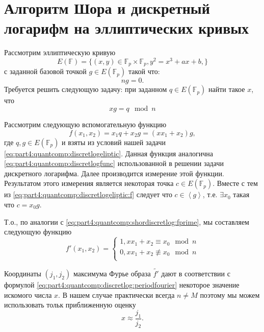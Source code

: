 \section{Алгоритм Шора и дискретный логарифм на эллиптических кривых} 
Рассмотрим эллиптическую кривую 
\[
E\left(\mathbb{F}\right) = \{
(x,y) \in \mathbb{F}_p \times \mathbb{F}_p, y^2 = x^3 +a x + b,
\}
\]
с заданной базовой точкой $g \in E\left(\mathbb{F}_p\right)$ такой что: 
\[
n g = 0.
\]
Требуется решить следующую задачу: при заданном $q
\in E\left(\mathbb{F}_p\right)$ найти такое $x$, что
\begin{equation}
x g = q \mod n
\label{eq:part4:quantcomp:discretlogeliptic}
\end{equation}

Рассмотрим следующую вспомогательную функцию
\begin{equation}
f(x_1, x_2) = x_1 q + x_2 g = \left(x x_1 + x_2\right) g,
\label{eq:part4:quantcomp:discretlogeliptic:f}
\end{equation}
где $q,g \in E\left(\mathbb{F}_p\right)$ и взяты из условий нашей
задачи \eqref{eq:part4:quantcomp:discretlogeliptic}. Данная функция
аналогична \eqref{eq:part4:quantcomp:discretlogfunc}
использованной в решении задачи дискретного логарифма. Далее
производится измерение этой функции. Результатом этого измерения
является некоторая точка $c \in E\left(\mathbb{F}_p\right)$. Вместе с
тем из \eqref{eq:part4:quantcomp:discretlogeliptic:f} следует что 
$c \in \left<g\right>$, т.е. $\exists x_0$ такая что $c = x_0 g$. 

Т.о., по аналогии с \eqref{eq:part4:quantcomp:shordiscretlog:fprime}, мы
составляем следующую функцию 
\begin{equation}
\label{eq:part4:quantcomp:shorelliptic:fprime}
f'\left(x_1, x_2\right) = 
\begin{cases}
1, x x_1 + x_2 \equiv x_0 \mod n \\
0, x x_1 + x_2 \not\equiv x_0 \mod n \\
\end{cases}
\end{equation}

Координаты $(j_1,j_2)$ максимума Фурье образа $\tilde{f'}$ дают в
соответствии с формулой
\eqref{eq:part4:quantcomp:discretlog:periodfourier} некоторое значение
искомого числа $x$. В нашем случае практически всегда $n \ne M$
поэтому мы можем использовать тольк приближенную оценку
\[
x \approx \frac{j_1}{j_2}.
\]

